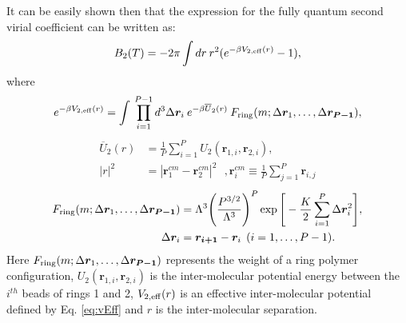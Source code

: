             It can be easily shown \cite{Garberoglio2009} then that the expression for the fully quantum second virial coefficient can be written as:
            \begin{equation}
                B_2 (T) = -2 \pi \displaystyle\int dr\: r^2 (e^{-\beta V_{2,\rm{eff}} (r)} - 1),
            \end{equation}
            where
            \begin{equation}\label{eq:vEff}
                e^{-\beta V_{2,\rm{eff}} (r)} = \displaystyle\int \: \prod\limits_{i=1}^{P-1} d^3 \Delta \bm{r}_i\: e^{-\beta \overline{U}_2 (r)}\: F_{\rm ring} (m; \Delta \bm{r}_1, \ldots , \Delta \bm{r_{P-1}}),
            \end{equation}
            \begin{equation}\label{eq:U2bar}
                \begin{aligned}
                    \overline{U}_2 (r) &= \displaystyle\frac{1}{P} \sum\limits_{i=1}^P U_2 (\bm{r}_{1,i}, \bm{r}_{2,i}),\\
                    |r|^2 &= |\bm{r}^{cm}_1 - \bm{r}^{cm}_2|^2 ~~~, \bm{r}^{cm}_i \equiv \frac{1}{P} \displaystyle\sum\limits_{j=1}^P \bm{r}_{i,j}
                \end{aligned}
            \end{equation}
            \begin{equation}\label{eq:fRing}
                \begin{aligned}
                    F_{\rm ring} (m; \Delta \bm{r}_1, \ldots , \Delta \bm{r_{P-1}}) &= \Lambda^3 \Bigg( \displaystyle\frac{P^{3/2}}{\Lambda^3} \Bigg)^P \exp \Bigg[-\frac{K}{2} \sum\limits_{i=1}^P \Delta \bm{r}_i^2 \Bigg],\\
                    \Delta \bm{r}_i &= \bm{r_{i+1}} - \bm{r}_i \: \: ( i = 1, \ldots, P-1).
                \end{aligned}
            \end{equation}
            Here $F_{\rm ring} (m; \Delta \bm{r}_1, \ldots , \Delta \bm{r_{P-1}})$ represents the weight of a ring polymer configuration, $\allowbreak U_2 (\bm{r}_{1,i}, \bm{r}_{2,i})$ is the inter-molecular potential energy between the $i^{th}$ beads of rings 1 and 2, $V_{2,\rm{eff}} (r)$ is an effective inter-molecular potential defined by Eq. \eqref{eq:vEff} and $r$ is the inter-molecular separation.

